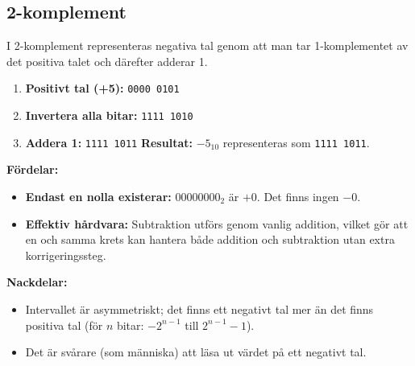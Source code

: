 \documentclass[
  swedish,
  letterpaper,
  oneside,
  openany]{book}
\providecommand{\tightlist}{%
  \setlength{\itemsep}{0pt}\setlength{\parskip}{0pt}}
\begin{document}
\subsection{2-komplement}\label{komplement-1}

I 2-komplement representeras negativa tal genom att man tar
1-komplementet av det positiva talet och därefter adderar 1.

\begin{tcolorbox}[enhanced jigsaw, arc=.35mm, bottomrule=.15mm, bottomtitle=1mm, breakable, colback=white, colbacktitle=quarto-callout-note-color!10!white, colframe=quarto-callout-note-color-frame, coltitle=black, left=2mm, leftrule=.75mm, opacityback=0, opacitybacktitle=0.6, rightrule=.15mm, title=\textcolor{quarto-callout-note-color}{\faInfo}\hspace{0.5em}{Exempel: \(-5_{10}\) i 8-bitars 2-komplement}, titlerule=0mm, toprule=.15mm, toptitle=1mm]

\begin{enumerate}
\def\labelenumi{\arabic{enumi}.}
\tightlist
\item
  \textbf{Positivt tal (+5):} \texttt{0000\ 0101}
\item
  \textbf{Invertera alla bitar:} \texttt{1111\ 1010}
\item
  \textbf{Addera 1:} \texttt{1111\ 1011} \textbf{Resultat:} \(-5_{10}\)
  representeras som \texttt{1111\ 1011}.
\end{enumerate}

\end{tcolorbox}

\textbf{Fördelar:}

\begin{itemize}
\tightlist
\item
  \textbf{Endast en nolla existerar:} \(00000000_2\) är \(+0\). Det
  finns ingen \(-0\).
\item
  \textbf{Effektiv hårdvara:} Subtraktion utförs genom vanlig addition,
  vilket gör att en och samma krets kan hantera både addition och
  subtraktion utan extra korrigeringssteg.
\end{itemize}

\textbf{Nackdelar:}

\begin{itemize}
\tightlist
\item
  Intervallet är asymmetriskt; det finns ett negativt tal mer än det
  finns positiva tal (för \(n\) bitar: \(-2^{n-1}\) till
  \(2^{n-1} - 1\)).
\item
  Det är svårare (som människa) att läsa ut värdet på ett negativt tal.
\end{itemize}
\end{document}
